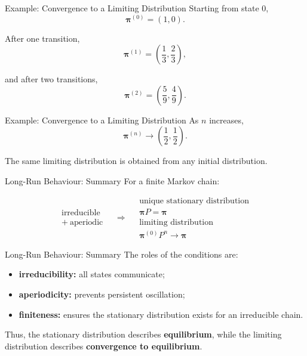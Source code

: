 \documentclass[
  ignorenonframetext,
  aspectratio=169,
]{beamer}
\providecommand{\tightlist}{%
  \setlength{\itemsep}{0pt}\setlength{\parskip}{0pt}}
\begin{document}
\begin{frame}{Example: Convergence to a Limiting Distribution}
\protect{}\label{example-convergence-to-a-limiting-distribution-1}
Starting from state \(0\), \[
\boldsymbol{\pi}^{(0)}=(1,0).
\]

After one transition, \[
\boldsymbol{\pi}^{(1)}
=
\left(\frac13,\frac23\right),
\]

and after two transitions, \[
\boldsymbol{\pi}^{(2)}
=
\left(\frac59,\frac49\right).
\]
\end{frame}

\begin{frame}{Example: Convergence to a Limiting Distribution}
\protect{}\label{example-convergence-to-a-limiting-distribution-2}
As \(n\) increases, \[
\boxed{
\boldsymbol{\pi}^{(n)}
\longrightarrow
\left(\frac12,\frac12\right).
}
\]

The same limiting distribution is obtained from any initial
distribution.
\end{frame}

\begin{frame}{Long-Run Behaviour: Summary}
\protect{}\label{long-run-behaviour-summary}
For a finite Markov chain:

\[
\boxed{
\begin{array}{c}
\text{irreducible}\\
+\ \text{aperiodic}
\end{array}
}
\quad\Longrightarrow\quad
\boxed{
\begin{array}{c}
\text{unique stationary distribution}\\
\boldsymbol{\pi}P=\boldsymbol{\pi}\\[2pt]
\text{limiting distribution}\\
\boldsymbol{\pi}^{(0)}P^n\to\boldsymbol{\pi}
\end{array}
}
\]
\end{frame}

\begin{frame}{Long-Run Behaviour: Summary}
\protect{}\label{long-run-behaviour-summary-1}
The roles of the conditions are:

\begin{itemize}
\tightlist
\item
  \textbf{irreducibility:} all states communicate;
\item
  \textbf{aperiodicity:} prevents persistent oscillation;
\item
  \textbf{finiteness:} ensures the stationary distribution exists for an
  irreducible chain.
\end{itemize}

Thus, the stationary distribution describes \textbf{equilibrium}, while
the limiting distribution describes \textbf{convergence to equilibrium}.
\end{frame}
\end{document}
